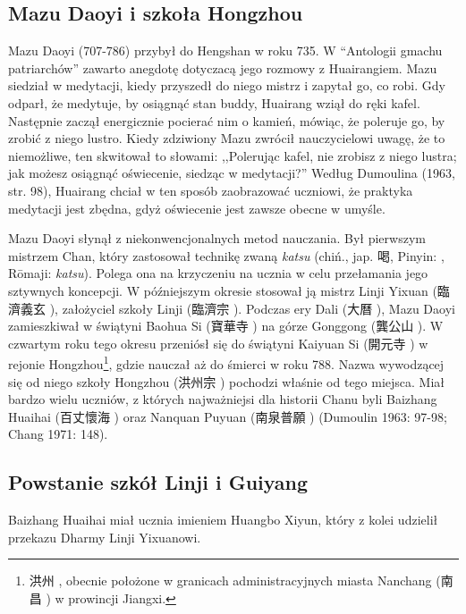 \subsection{Mazu Daoyi i szkoła Hongzhou}
Mazu Daoyi (707-786) przybył do Hengshan w roku 735.
W ``Antologii gmachu patriarchów'' zawarto anegdotę dotyczacą jego rozmowy z Huairangiem.
Mazu siedział w medytacji, kiedy przyszedł do niego mistrz i zapytał go, co robi.
Gdy odparł, że medytuje, by osiągnąć stan buddy, Huairang wziął do ręki kafel.
Następnie zaczął energicznie pocierać nim o kamień, mówiąc, że poleruje go, by zrobić z niego lustro.
Kiedy zdziwiony Mazu zwrócił nauczycielowi uwagę, że to niemożliwe, ten skwitował to słowami: ,,Polerując kafel, nie zrobisz z niego lustra; jak możesz osiągnąć oświecenie, siedząc w medytacji?'' %
Według Dumoulina (1963, str. 98), Huairang chciał w ten sposób zaobrazować uczniowi, że praktyka medytacji jest zbędna, gdyż oświecenie jest zawsze obecne w umyśle.

Mazu Daoyi słynął z niekonwencjonalnych metod nauczania.
Był pierwszym mistrzem Chan, który zastosował technikę zwaną \textit{katsu} (chiń., jap. 喝, Pinyin: , Rōmaji: \textit{katsu}).
Polega ona na krzyczeniu na ucznia w celu przełamania jego sztywnych koncepcji.
W późniejszym okresie stosował ją mistrz Linji Yixuan (臨濟義玄 ), założyciel szkoły Linji (臨濟宗 ). %
Podczas ery Dali (大曆 ), Mazu Daoyi zamieszkiwał w świątyni Baohua Si (寶華寺 ) na górze Gonggong (龔公山 ).
W czwartym roku tego okresu przeniósł się do świątyni Kaiyuan Si (開元寺 ) w rejonie Hongzhou\footnote{洪州 , obecnie położone w granicach administracyjnych miasta Nanchang (南昌 ) w prowincji Jiangxi.}, gdzie nauczał aż do śmierci w roku 788.
Nazwa wywodzącej się od niego szkoły Hongzhou (洪州宗 ) pochodzi właśnie od tego miejsca.
Miał bardzo wielu uczniów, z których najważniejsi dla historii Chanu byli Baizhang Huaihai (百丈懷海 ) oraz Nanquan Puyuan (南泉普願 )
(Dumoulin 1963: 97-98; Chang 1971: 148).

\subsection{Powstanie szkół Linji i Guiyang}
Baizhang Huaihai miał ucznia imieniem Huangbo Xiyun, który z kolei udzielił przekazu Dharmy Linji Yixuanowi.


